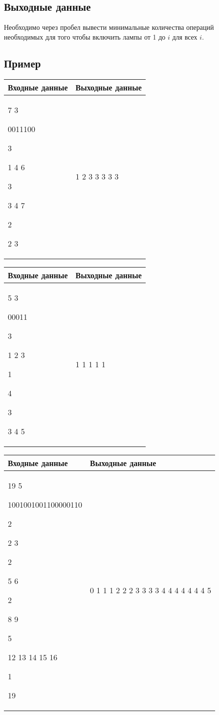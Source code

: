 \documentclass[a4]{article}
\begin{document}
\subsection*{Выходные данные}
\label{sec:org1ab7414}
Необходимо через пробел вывести минимальные количества операций необходимых
для того чтобы включить лампы от 1 до \(i\) для всех \(i\).

\subsection*{Пример}
\label{sec:org25482f8}

\begin{table}[H]
\begin{center}
\begin{tabular}{|m{4cm}|m{4cm}|}
\hline
Входные данные & Выходные данные \\ \hline
7 3

0011100

3

1 4 6

3

3 4 7

2

2 3
&
1 2 3 3 3 3 3
\\ \hline
\end{tabular}
\end{center}
\end{table}

\begin{table}[H]
\begin{center}
\begin{tabular}{|m{4cm}|m{4cm}|}
\hline
Входные данные & Выходные данные \\ \hline
5 3

00011

3

1 2 3

1

4

3

3 4 5
&
1 1 1 1 1
\\ \hline
\end{tabular}
\end{center}
\end{table}
\begin{table}[H]
\begin{center}
\begin{tabular}{|m{4cm}|m{4cm}|}
\hline
Входные данные & Выходные данные \\ \hline
19 5

1001001001100000110

2

2 3

2

5 6

2

8 9

5

12 13 14 15 16

1

19
&
0 1 1 1 2 2 2 3 3 3 3 4 4 4 4 4 4 4 5
\\ \hline
\end{tabular}
\end{center}
\end{table}
\pagebreak
\end{document}
